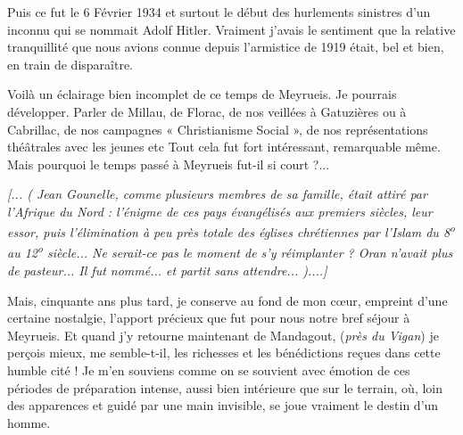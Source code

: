 Puis ce fut le 6 Février 1934 et surtout le début des hurlements sinistres d’un inconnu
qui se nommait Adolf Hitler. Vraiment j’avais le sentiment que la relative tranquillité
que nous avions connue depuis l’armistice de 1919 était, bel et bien, en train de
disparaître.

Voilà un éclairage bien incomplet de ce temps de Meyrueis. Je pourrais développer.
Parler de Millau, de Florac, de nos veillées à Gatuzières ou à Cabrillac, de nos
campagnes « Christianisme Social », de nos représentations théâtrales avec les jeunes
etc Tout cela fut fort intéressant, remarquable même. Mais pourquoi le temps passé à
Meyrueis fut-il si court ?...

\emph{[... ( Jean Gounelle, comme plusieurs membres de sa famille, était attiré par l’Afrique du Nord :
l’énigme de ces pays évangélisés aux premiers siècles, leur essor, puis l’élimination à peu près totale
des églises chrétiennes par l’Islam du 8\textsuperscript{o} au 12\textsuperscript{o} siècle... Ne serait-ce pas le moment de s’y
réimplanter ? Oran n’avait plus de pasteur... Il fut nommé... et partit sans attendre... )....]}

Mais, cinquante ans plus tard, je conserve au fond de mon cœur, empreint d’une
certaine nostalgie, l’apport précieux que fut pour nous notre bref séjour à Meyrueis.
Et quand j’y retourne maintenant de Mandagout, (\emph{près du Vigan}) je perçois mieux, me
semble-t-il, les richesses et les bénédictions reçues dans cette humble cité ! Je m’en
souviens comme on se souvient avec émotion de ces périodes de préparation intense,
aussi bien intérieure que sur le terrain, où, loin des apparences et guidé par une main
invisible, se joue vraiment le destin d’un homme.
